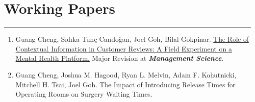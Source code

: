 \documentclass[12pt, a4paper]{article}
\begin{document}
{\section*{Working Papers}
\vspace*{4pt}
\hrule

\begin{enumerate}[leftmargin=30pt, resume]
	
	\item Guang Cheng, S\i{}d\i{}ka Tun\c{c} Cando\u{g}an, Joel Goh, Bilal Gokpinar.
	\href{https://ssrn.com/abstract=4956298}{The Role of Contextual Information in Customer Reviews: A Field Experiment on a Mental Health Platform.} Major Revision at \textit{\textbf{Management Science}}.


	\item Guang Cheng, Joshua M. Hagood, Ryan L. Melvin, Adam F. Kohutnicki, Mitchell H. Tsai, Joel Goh. The Impact of Introducing Release Times for Operating Rooms on Surgery Waiting Times.

\end{enumerate}









}
\end{document}
